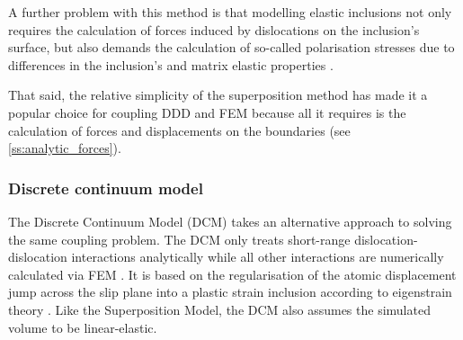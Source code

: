 A further problem with this method is that modelling elastic inclusions not only requires the calculation of forces induced by dislocations on the inclusion's surface, but also demands the calculation of so-called polarisation stresses due to differences in the inclusion's and matrix elastic properties \cite{dismot, bdd, ddd_precip}.

That said, the relative simplicity of the superposition method has made it a popular choice \cite{analytic_tractions, ddd_fem_sm, ddd_fem_sm2} for coupling DDD and FEM because all it requires is the calculation of forces and displacements on the boundaries (see \cref{ss:analytic_forces}).

\subsubsection{Discrete continuum model}
\label{sss:discrete_continuum}

The Discrete Continuum Model (DCM) takes an alternative approach to solving the same coupling problem. The DCM only treats short-range dislocation-dislocation interactions analytically while all other interactions are numerically calculated via FEM \cite{dcm}. It is based on the regularisation of the atomic displacement jump across the slip plane into a plastic strain inclusion according to eigenstrain theory \cite{eigenstrain}. Like the Superposition Model, the DCM also assumes the simulated volume to be linear-elastic.

